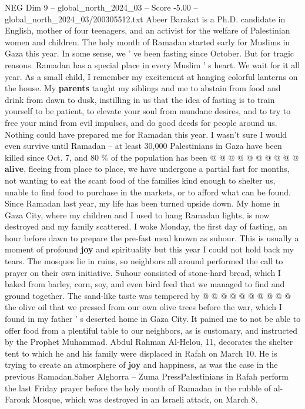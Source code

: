\begin{textsample}{NEG Dim 9 – global\_north\_2024\_03 – Score -5.00 – global\_north\_2024\_03/200305512.txt}  \label{ex:f9_neg_250}
Abeer Barakat is a Ph.D. candidate in English, mother of four teenagers, and an activist for the welfare of Palestinian women and children.
The holy month of Ramadan started early for Muslims in Gaza this year.
In some sense, we ' ve been fasting since October.
But for tragic reasons.
Ramadan has a special place in every Muslim ' s heart.
We wait for it all year.
As a small child, I remember my excitement at hanging colorful lanterns on the house.
My \textbf{parents} taught my siblings and me to abstain from food and drink from dawn to dusk, instilling in us that the idea of fasting is to train yourself to be patient, to elevate your soul from mundane desires, and to try to free your mind from evil impulses, and do good deeds for people around us.
Nothing could have prepared me for Ramadan this year.
I wasn't sure I would even survive until Ramadan -- at least 30,000 Palestinians in Gaza have been killed since Oct. 7, and 80 \% of the population has been @ @ @ @ @ @ @ @ @ @ \textbf{alive}, fleeing from place to place, we have undergone a partial fast for months, not wanting to eat the scant food of the families kind enough to shelter us, unable to find food to purchase in the markets, or to afford what can be found.
Since Ramadan last year, my life has been turned upside down.
My home in Gaza City, where my children and I used to hang Ramadan lights, is now destroyed and my family scattered.
I woke Monday, the first day of fasting, an hour before dawn to prepare the pre-fast meal known as suhour.
This is usually a moment of profound \textbf{joy} and spirituality but this year I could not hold back my tears.
The mosques lie in ruins, so neighbors all around performed the call to prayer on their own initiative.
Suhour consisted of stone-hard bread, which I baked from barley, corn, soy, and even bird feed that we managed to find and ground together.
The sand-like taste was tempered by @ @ @ @ @ @ @ @ @ @ the olive oil that we pressed from our own olive trees before the war, which I found in my father ' s deserted home in Gaza City.
It pained me to not be able to offer food from a plentiful table to our neighbors, as is customary, and instructed by the Prophet Muhammad.
Abdul Rahman Al-Helou, 11, decorates the shelter tent to which he and his family were displaced in Rafah on March 10.
He is trying to create an atmosphere of \textbf{joy} and happiness, as was the case in the previous Ramadan.Saher Alghorra -- Zuma PressPalestinians in Rafah perform the last Friday prayer before the holy month of Ramadan in the rubble of al-Farouk Mosque, which was destroyed in an Israeli attack, on March 8.

\end{textsample}
